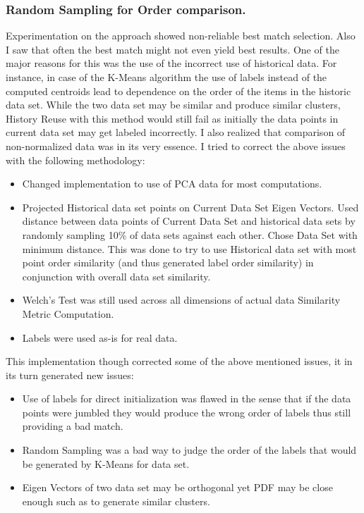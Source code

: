 \documentclass{vldb}
\begin{document}
\subsubsection{Random Sampling for Order comparison.}
Experimentation on the approach showed non-reliable best match selection. Also I saw that often the best match might not even yield best results. One of the major reasons for this was the use of the incorrect use of historical data. For instance, in case of the K-Means algorithm the use of labels instead of the computed centroids lead to dependence on the order of the items in the historic data set. While the two data set may be similar and produce similar clusters, History Reuse with this method would still fail as initially the data points in current data set may get labeled incorrectly. I also realized that comparison of non-normalized data was in its very essence. I tried to correct the above issues with the following methodology:
\begin{itemize}
    \item Changed implementation to use of PCA data for most computations.
    \item Projected Historical data set points on Current Data Set Eigen Vectors. Used distance between data points of Current Data Set and historical data sets by randomly sampling 10\% of data sets against each other. Chose Data Set with minimum distance. This was done to try to use Historical data set with most point order similarity (and thus generated label order similarity) in conjunction with overall data set similarity.
    \item Welch’s Test was still used across all dimensions of actual data Similarity Metric Computation.
    \item Labels were used as-is for real data.
\end{itemize}
This implementation though corrected some of the above mentioned issues, it in its turn generated new issues:
\begin{itemize}
    \item Use of labels for direct initialization was flawed in the sense that if the data points were jumbled they would produce the wrong order of labels thus still providing a bad match.
    \item Random Sampling was a bad way to judge the order of the labels that would be generated by K-Means for data set.
    \item Eigen Vectors of two data set may be orthogonal yet PDF may be close enough such as to generate similar clusters.
\end{itemize}
\end{document}
